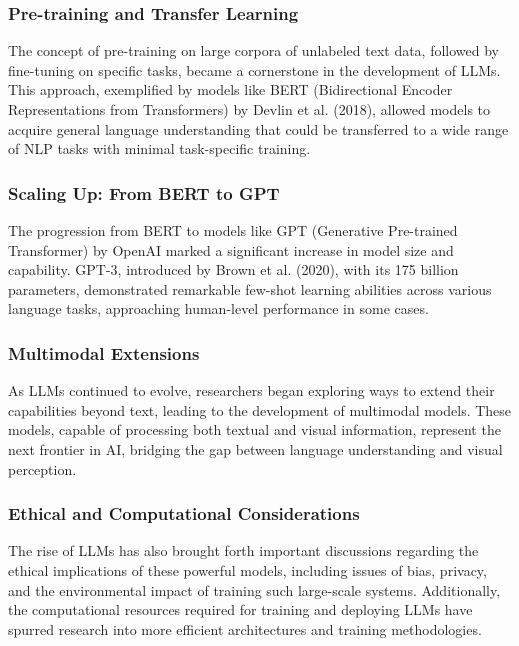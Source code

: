 \subsubsection{Pre-training and Transfer Learning}
The concept of pre-training on large corpora of unlabeled text data, followed by fine-tuning on specific tasks, became a cornerstone in the development of LLMs. This approach, exemplified by models like BERT (Bidirectional Encoder Representations from Transformers) by Devlin et al. (2018), allowed models to acquire general language understanding that could be transferred to a wide range of NLP tasks with minimal task-specific training.

\subsubsection{Scaling Up: From BERT to GPT}
The progression from BERT to models like GPT (Generative Pre-trained Transformer) by OpenAI marked a significant increase in model size and capability. GPT-3, introduced by Brown et al. (2020), with its 175 billion parameters, demonstrated remarkable few-shot learning abilities across various language tasks, approaching human-level performance in some cases.

\subsubsection{Multimodal Extensions}
As LLMs continued to evolve, researchers began exploring ways to extend their capabilities beyond text, leading to the development of multimodal models. These models, capable of processing both textual and visual information, represent the next frontier in AI, bridging the gap between language understanding and visual perception.

\subsubsection{Ethical and Computational Considerations}
The rise of LLMs has also brought forth important discussions regarding the ethical implications of these powerful models, including issues of bias, privacy, and the environmental impact of training such large-scale systems. Additionally, the computational resources required for training and deploying LLMs have spurred research into more efficient architectures and training methodologies.


